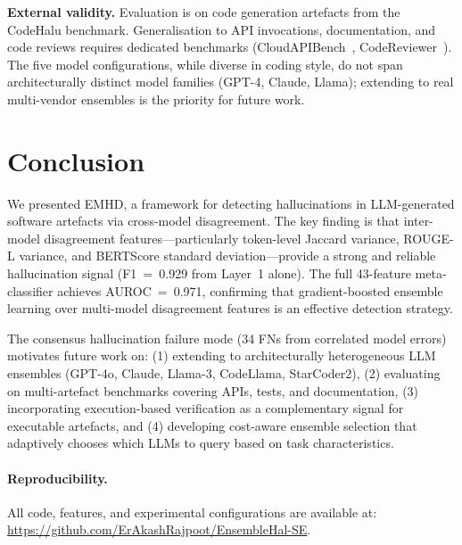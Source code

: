 \documentclass[runningheads]{llncs}
\newcommand{\method}{\textsc{EMHD}}
\begin{document}
\textbf{External validity.} Evaluation is on code generation artefacts from the CodeHalu benchmark. Generalisation to API invocations, documentation, and code reviews requires dedicated benchmarks (CloudAPIBench~\cite{jain2025codeapi}, CodeReviewer~\cite{li2022codereviewer}). The five model configurations, while diverse in coding style, do not span architecturally distinct model families (GPT-4, Claude, Llama); extending to real multi-vendor ensembles is the priority for future work.


\section{Conclusion}
\label{sec:conclusion}

We presented \method{}, a framework for detecting hallucinations in LLM-generated software artefacts via cross-model disagreement. The key finding is that inter-model disagreement features---particularly token-level Jaccard variance, ROUGE-L variance, and BERTScore standard deviation---provide a strong and reliable hallucination signal (F1~=~0.929 from Layer~1 alone). The full 43-feature meta-classifier achieves AUROC~=~0.971, confirming that gradient-boosted ensemble learning over multi-model disagreement features is an effective detection strategy.

The consensus hallucination failure mode (34 FNs from correlated model errors) motivates future work on: (1) extending to architecturally heterogeneous LLM ensembles (GPT-4o, Claude, Llama-3, CodeLlama, StarCoder2), (2) evaluating on multi-artefact benchmarks covering APIs, tests, and documentation, (3) incorporating execution-based verification as a complementary signal for executable artefacts, and (4) developing cost-aware ensemble selection that adaptively chooses which LLMs to query based on task characteristics.

\paragraph{Reproducibility.} All code, features, and experimental configurations are available at: \url{https://github.com/ErAkashRajpoot/EnsembleHal-SE}.
\end{document}
